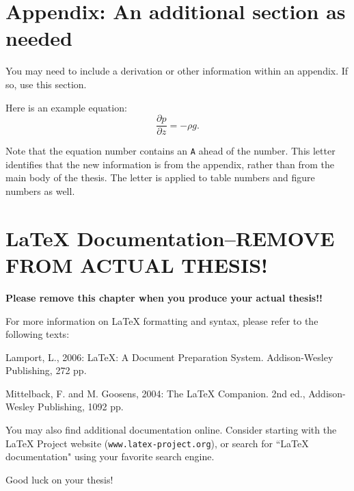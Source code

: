 \documentclass[master]{UWMThesis}
\newcommand{\ptlder}[2]{\frac{\partial #1}{\partial #2}}
\begin{document}
\chapter*{Appendix: An additional section as needed} \label{sec:appendix}

You may need to include a derivation or other information within an appendix.  If so, use this section.  

Here is an example equation:
\begin{equation}
    \ptlder{p}{z} = - \rho g.
                                                       \label{eq:hydrostatic}
\end{equation}

Note that the equation number contains an \verb=A= ahead of the number.  This letter identifies that the new information is from the appendix, rather than from the main body of the thesis.  The letter is applied to table numbers and figure numbers as well.


\chapter{LaTeX Documentation--REMOVE FROM ACTUAL THESIS!}
{\textbf{Please remove this chapter when you produce your actual thesis!!}}

For more information on LaTeX formatting and syntax, please refer to the following texts:

Lamport, L., 2006: LaTeX: A Document Preparation System.  Addison-Wesley Publishing, 272 pp.

Mittelback, F. and M. Goosens, 2004: The LaTeX Companion.  2nd ed., Addison-Wesley Publishing, 1092 pp.

\noindent You may also find additional documentation online.  Consider starting with the LaTeX Project website (\verb=www.latex-project.org=), or search for ``LaTeX documentation" using your favorite search engine.
\vspace{2pc}

Good luck on your thesis!



\end{document}
